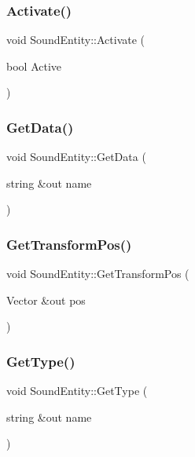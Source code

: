 \subsubsection{\texorpdfstring{Activate()}{Activate()}}
{\footnotesize\ttfamily void Sound\+Entity\+::\+Activate (\begin{DoxyParamCaption}\item[{bool}]{Active }\end{DoxyParamCaption})}

\hypertarget{class_sound_entity_ad3010f15ef3dc1942601d570ea155553}{}\label{class_sound_entity_ad3010f15ef3dc1942601d570ea155553} 
\subsubsection{\texorpdfstring{Get\+Data()}{GetData()}}
{\footnotesize\ttfamily void Sound\+Entity\+::\+Get\+Data (\begin{DoxyParamCaption}\item[{string \&out}]{name }\end{DoxyParamCaption})}

\hypertarget{class_sound_entity_ae2995641487cd493b1243d5d73b97517}{}\label{class_sound_entity_ae2995641487cd493b1243d5d73b97517} 
\subsubsection{\texorpdfstring{Get\+Transform\+Pos()}{GetTransformPos()}}
{\footnotesize\ttfamily void Sound\+Entity\+::\+Get\+Transform\+Pos (\begin{DoxyParamCaption}\item[{Vector \&out}]{pos }\end{DoxyParamCaption})}

\hypertarget{class_sound_entity_a2dccd8c3d3070b1f186227997fe22b0a}{}\label{class_sound_entity_a2dccd8c3d3070b1f186227997fe22b0a} 
\subsubsection{\texorpdfstring{Get\+Type()}{GetType()}}
{\footnotesize\ttfamily void Sound\+Entity\+::\+Get\+Type (\begin{DoxyParamCaption}\item[{string \&out}]{name }\end{DoxyParamCaption})}

